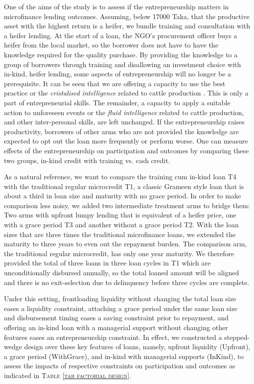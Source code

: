 	One of the aims of the study is to assess if the entrepreneurship matters in microfinance lending outcomes. Assuming, below 17000 Taka, that the productive asset with the highest return is a heifer, we bundle training and consultation with a heifer lending. At the start of a loan, the NGO's procurement officer buys a heifer from the local market, so the borrower does not have to have the knowledge required for the quality purchase. By providing the knowledge to a group of borrowers through training and disallowing an investment choice with in-kind, heifer lending, some aspects of entrepreneurship will no longer be a prerequisite. It can be seen that we are offering a capacity to use the best practice or the \textit{cristalised intelligence} related to cattle production \citep{Cattell1963}. This is only a part of entrepreneurial skills. The remainder, a capacity to apply a suitable action to unforeseen events or the \textit{fluid intelligence} related to cattle production, and other inter-personal skills, are left unchanged. If the entrepreneurship raises productivity, borrowers of other arms who are not provided the knowledge are expected to opt out the loan more frequently or perform worse. One can measure effects of the entrepreneurship on participation and outcomes by comparing these two groups, in-kind credit with training vs. cash credit.

	As a natural reference, we want to compare the training cum in-kind loan \textsf{T4} with the traditional regular microcredit \textsf{T1}, a classic Grameen style loan that is about a third in loan size and maturity with no grace period. In order to make comparison less noisy, we added two intermediate treatment arms to bridge them: Two arms with upfront lumpy lending that is equivalent of a heifer price, one with a grace period \textsf{T3} and another without a grace period \textsf{T2}. With the loan sizes that are three times the traditional microfinance loans, we extended the maturity to three years to even out the repayment burden. The comparison arm, the traditional regular microcredit, has only one year maturity. We therefore provided the total of three loans in three loan cycles in \textsf{T1} which are unconditionally disbursed annually, so the total loaned amount will be aligned and there is no exit-selection due to delinquency before three cycles are complete. 
	
	Under this setting, frontloading liquidity without changing the total loan size eases a liquidity constraint, attaching a grace period under the same loan size and disbursement timing eases a saving constraint prior to repayment, and offering an in-kind loan with a managerial support without changing other features eases an entrepreneurship constraint. In effect, we constructed a stepped-wedge design over these key features of loans, namely, upfront liquidity (\textsf{Upfront}), a grace period (\textsf{WithGrace}), and in-kind with managerial supports (\textsf{InKind}), to assess the impacts of respective constraints on participation and outcomes as indicated in \textsc{\normalsize Table \ref{tab factorial design}}. 

